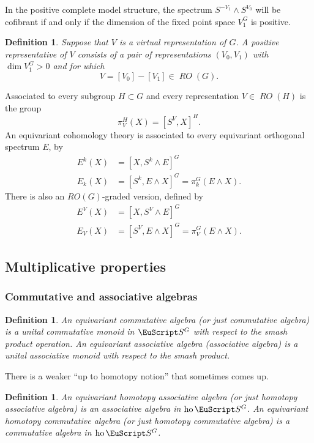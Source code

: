 \documentclass{amsart}
\newtheorem{definition}[equation]{Definition}
\newenvironment{defin}{\begin{definition}\rm}{\end{definition}}
\theoremstyle{definition}
\newtheorem{defin}[equation]{Definition}
\theoremstyle{remark}
\newcommand{\spectra}{\EuScript S}
\DeclareMathOperator{\ho}{ho}
\newcommand{\ugspectra}[1]{\spectra^{#1}}
\DeclareMathOperator{\RO}{\mathit {RO}}
\begin{document}
In the positive complete model structure, the spectrum
$S^{-V_{1}}\wedge S^{V_{0}}$ will be cofibrant if and only if the
dimension of the fixed point space $V_{1}^{G}$ is positive.

\begin{defin}
\label{def:39} Suppose that $V$ is a virtual representation of $G$.  A
{\em positive representative} of $V$ consists of a pair of
representations $(V_{0}, V_{1})$ with $\dim V_{1}^{G}>0$ and for which
\[
V=[V_{0}]-[V_{1}] \in \RO(G).
\]
\end{defin}

Associated to every subgroup $H\subset G$ and every representation
$V\in \RO(H)$ is the group
\[
\pi_{V}^{H}(X) = [S^{V},X]^{H}.
\]
An equivariant cohomology theory is associated to every equivariant
orthogonal spectrum $E$, by
\begin{align*}
E^{k}(X) &= [X,S^{k}\wedge E]^{G} \\
E_{k}(X) &= [S^{k},E\wedge X]^{G} = \pi^{G}_{k}(E\wedge X). 
\end{align*}
There is also an $RO(G)$-graded version, defined by 
\begin{align*}
E^{V}(X) &= [X,S^{V}\wedge E]^{G} \\
E_{V}(X) &= [S^{V},E\wedge X]^{G} = \pi^{G}_{V}(E\wedge X).
\end{align*}


\subsection{Multiplicative properties}

\subsubsection{Commutative and associative
algebras} \label{sec:equiv-einfty-rings}

\begin{defin}
\label{def:15} An {\em equivariant commutative algebra} (or just {\em
commutative algebra}) is a unital commutative monoid in
$\ugspectra{G}$ with respect to the smash product operation.  An {\em
equivariant associative algebra} ({\em associative algebra}) is a
unital associative monoid with respect to the smash product.
\end{defin}

There is a weaker ``up to homotopy notion'' that sometimes comes up.

\begin{defin}
\label{def:16} An {\em equivariant homotopy associative algebra} (or
just {\em homotopy associative algebra}) is an associative algebra in
$\ho\ugspectra{G}$.  An {\em equivariant homotopy commutative algebra}
(or just {\em homotopy commutative algebra}) is a commutative algebra
in $\ho\ugspectra{G}$.
\end{defin}
\end{document}
